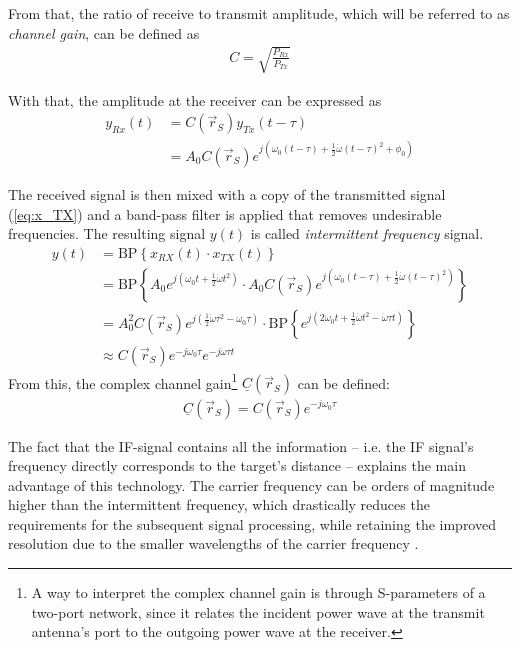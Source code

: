 From that, the ratio of receive to transmit amplitude,
which will be referred to as \emph{channel gain}, can be defined as
\begin{align}
    C = \sqrt{\frac{P_{Rx}}{P_{Tx}}}
\end{align}

With that, the amplitude at the receiver can be expressed as
\begin{align}
    y_{Rx}(t) & = C(\vec r_S) y_{Tx}(t-\tau)                                                                     \\
              & = A_0C(\vec r_S) e^{j\left(\omega_0(t-\tau) + \frac{1}{2}\dot \omega (t-\tau)^2 + \phi_0\right)}
\end{align}

The received signal is then mixed with a copy of the transmitted signal (\ref{eq:x_TX})
and a band-pass filter is applied that removes undesirable frequencies.
The resulting signal $y(t)$ is called \textit{intermittent frequency} signal.
\begin{align}
    y(t) & = \text{BP} \left\{ x_{RX}(t) \cdot x_{TX}(t) \right\}                       \\
         & = \text{BP} \left\{
    A_0 e^{j(\omega_0t + \frac{1}{2}\dot \omega t^2) }
    \cdot A_0C(\vec r_S) e^{j(\omega_0(t-\tau) + \frac{1}{2}\dot \omega (t-\tau)^2) }
    \right\}                                                                            \\
         & = A_0^2C(\vec r_S)
    e^{j(\frac{1}{2}\dot\omega\tau^2- \omega_0\tau)}
    \cdot  \text{BP} \left\{
    e^{j(2\omega_0 t + \frac{1}{2}\dot\omega t^2 - \dot\omega\tau t)}
    \right\}                                                                            \\
         & \approx C(\vec r_S)e^{-j\omega_0\tau} e^{-j\dot\omega\tau t} \label{eq:y_IF}
\end{align}
From this, the complex channel gain\footnote{
    A way to interpret the complex channel gain is through S-parameters of a two-port network,
    since it relates the incident power wave at the transmit antenna's port to the outgoing power wave at the receiver.
} $\underline C(\vec r_S)$ can be defined:
\begin{align}
    \underline C(\vec r_S) = C(\vec r_S)e^{-j\omega_0\tau} \label{eq:G}
\end{align}

The fact that the IF-signal contains all the information
-- i.e. the IF signal's frequency directly corresponds to the target's distance --
explains the main advantage of this technology.
The carrier frequency can be orders of magnitude higher than the intermittent frequency,
which drastically reduces the requirements for the subsequent signal processing,
while retaining the improved resolution due to the smaller wavelengths of the carrier frequency \cite{jankiraman}.

